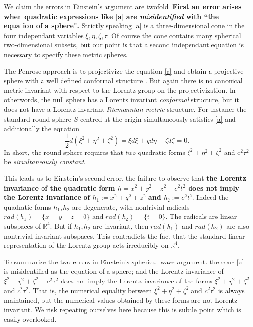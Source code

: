 \documentclass[12pt]{article}
\newcommand{\bR}{\mathbb{R}}
\newcommand{\del}{\partial}
\begin{document}
We claim the errors in Einstein's argument are twofold. \textbf{First an error arises when quadratic expressions like \eqref{a} are \emph{misidentified} with ``the equation of a sphere".} Strictly speaking \eqref{a} is a three-dimensional cone in the four independant variables $\xi, \eta, \zeta, \tau$. Of course the cone contains many spherical two-dimensional subsets, but our point is that a second independant equation is necessary to specify these metric spheres. 

The Penrose approach is to projectivize the equation \eqref{a} and obtain a projective sphere with a well defined conformal structure \cite[Ch 1.]{penrose1984spinors}. But again there is no canonical metric invariant with respect to the Lorentz group on the projectivization. In otherwords, the null sphere has a Lorentz invariant \emph{conformal} structure, but it does not have a Lorentz invariant \emph{Riemannian metric} structure. For instance the standard round sphere $S$ centred at the origin simultaneously satisfies \eqref{a} and additionally the equation $$\frac{1}{2}d(\xi^2+\eta^2+\zeta^2)=\xi d\xi+\eta d\eta +\zeta d\zeta=0.$$ In short, the round sphere requires that \emph{two} quadratic forms $\xi^2+\eta^2+\zeta^2$ and $c^2\tau^2$ be \emph{simultaneously constant}. 

This leads us to Einstein's second error, the failure to observe that \textbf{the Lorentz invariance of the quadratic form $h=x^2+y^2+z^2-c^2t^2$ does not imply the Lorentz invariance of $h_1:=x^2+y^2+z^2$ and $h_2:=c^2 t^2.$} Indeed the quadratic forms $h_1, h_2$ are degenerate, with nontrivial radicals $rad(h_1)=\{x=y=z=0\}$ and $rad(h_2)=\{t=0\}.$ The radicals are linear subspaces of $\bR^4$. But if $h_1, h_2$ are invariant, then $rad(h_1)$ and $rad(h_2)$ are also nontrivial invariant subspaces. This contradicts the fact that the standard linear representation of the Lorentz group acts irreducibly on $\bR^4$.

To summarize the two errors in Einstein's spherical wave argument: the cone \eqref{a} is misidentified as the equation of a sphere; and the Lorentz invariance of $\xi^2+\eta^2+\zeta^2-c^2\tau^2$ does not imply the Lorentz invariance of the forms $\xi^2+\eta^2+\zeta^2$ and $c^2 \tau^2$. That is, the numerical equality between $\xi^2+\eta^2+\zeta^2$ and $c^2 \tau^2$ is always maintained, but the numerical values obtained by these forms are not Lorentz invariant. We risk repeating ourselves here because this is subtle point which is easily overlooked.


\end{document}
